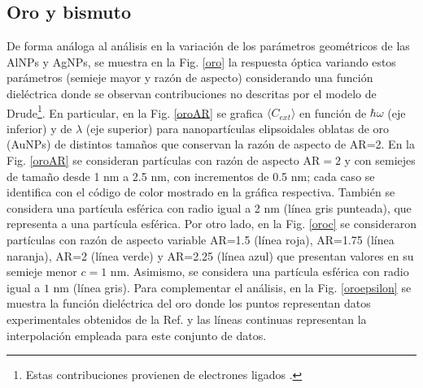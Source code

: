 \subsection*{Oro y bismuto}
De forma análoga al análisis en la variación de los parámetros geométricos de las AlNPs y AgNPs, se muestra en la Fig. \ref{oro} la respuesta óptica variando estos parámetros (semieje mayor y razón de aspecto) considerando una función dieléctrica donde se observan contribuciones no descritas por el modelo de Drude\footnote{Estas contribuciones provienen de electrones ligados \cite{Plasmonics}.}. En particular, en la Fig. \ref{oroAR} se grafica $\langle C_{ext}\rangle$ en función de $\hbar\omega$ (eje inferior) y de $\lambda$ (eje superior) para nanopartículas elipsoidales oblatas de oro (AuNPs) de distintos tamaños que conservan la razón de aspecto de AR=2.  En la Fig. \ref{oroAR} se consideran partículas con razón de aspecto AR$=2$ y con semiejes de tamaño desde 1  nm a 2.5 nm, con incrementos de 0.5 nm; cada caso se identifica con el código de color mostrado en la gráfica respectiva. También se considera una partícula esférica con radio igual a 2 nm (línea gris punteada), que representa a una partícula esférica. Por otro lado, en la Fig. \ref{oroc} se consideraron partículas con razón de aspecto variable AR=1.5 (línea roja), AR=1.75 (línea naranja), AR=2 (línea verde) y AR=2.25 (línea azul) que presentan valores en su semieje menor $c=1\text{ nm}$. Asimismo, se considera una partícula esférica con radio igual a $1\text{ nm}$ (línea gris). Para complementar el análisis, en la Fig. \ref{oroepsilon} se muestra la función dieléctrica del oro donde los puntos representan datos experimentales obtenidos de la Ref. \cite{Plata} y las líneas continuas representan la interpolación empleada para este conjunto de datos.\\

